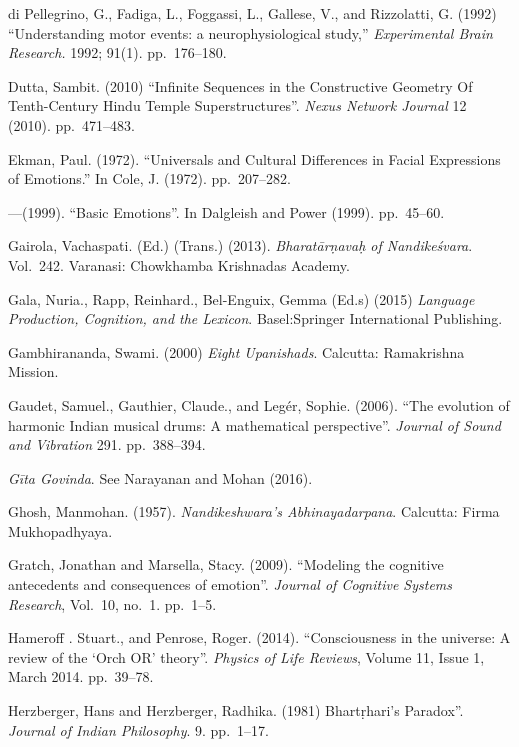 \begin{thebibliography}{99}
di Pellegrino, G., Fadiga, L., Foggassi, L., Gallese, V., and Rizzolatti, G. (1992) “Understanding motor events: a neurophysiological study,” \textsl{Experimental Brain Research.} 1992; 91(1). pp.~176--180.

Dutta, Sambit. (2010) “Infinite Sequences in the Constructive Geometry Of Tenth-Century Hindu Temple  Superstructures”. \textsl{Nexus Network Journal} 12 (2010). pp.~471--483.

Ekman, Paul. (1972). ``Universals and Cultural Differences in Facial Expressions of Emotions.'' In Cole, J. (1972). pp.~207--282.

---\kern3pt(1999). ``Basic Emotions''. In Dalgleish and Power (1999). pp.~45--60.


Gairola, Vachaspati. (Ed.) (Trans.) (2013). \textsl{Bharatārṇavaḥ of Nandikeśvara}. Vol.~242. Varanasi: Chowkhamba Krishnadas Academy.

Gala, Nuria., Rapp, Reinhard., Bel-Enguix, Gemma (Ed.s) (2015) \textsl{Language Production, Cognition, and the Lexicon}. Basel:Springer International Publishing.

Gambhirananda, Swami. (2000) \textsl{Eight Upanishads}. Calcutta: Ramakrishna Mission.

Gaudet, Samuel., Gauthier, Claude., and Legér, Sophie. (2006). “The evolution of harmonic Indian musical drums: A mathematical perspective”. \textsl{Journal of Sound and Vibration} 291. pp.~388--394.

\textsl{Gīta Govinda}. See Narayanan and Mohan (2016).

Ghosh, Manmohan. (1957). \textsl{Nandikeshwara’s Abhinayadarpana}. Calcutta: Firma Mukhopadhyaya.

Gratch, Jonathan and Marsella, Stacy. (2009). ``Modeling the cognitive antecedents and consequences of emotion”. \textsl{Journal of Cognitive Systems Research}, Vol.~10, no.~1. pp.~1--5.

Hameroff . Stuart., and Penrose, Roger. (2014). “Consciousness in the universe: A review of the ‘Orch OR’ theory”. \textsl{Physics of Life Reviews}, Volume 11, Issue 1, March 2014. pp.~39--78.

Herzberger, Hans and Herzberger, Radhika. (1981) Bhartṛhari's Paradox”. \textsl{Journal of Indian Philosophy}. 9. pp.~1--17.


\end{thebibliography}
